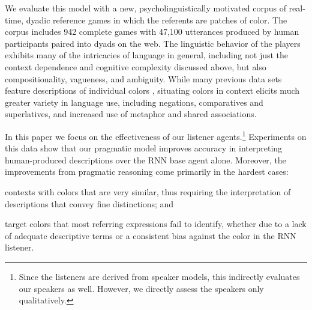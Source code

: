 \documentclass[11pt,letterpaper]{article}
\newcommand{\term}{\textit}
\renewcommand{\|}{\mid}
\begin{document}

We evaluate this model with a new, psycholinguistically motivated corpus of real-time, dyadic reference games in which
the referents are patches of color. 
The corpus includes 942 complete games with 47,100 utterances produced by
human participants paired into dyads on the web. The linguistic
behavior of the players exhibits many of the intricacies of language
in general, including not just the context dependence and cognitive
complexity discussed above, but also compositionality, vagueness, and
ambiguity. While many previous data sets feature descriptions of
individual colors \cite{Cook2005,Munroe2010,Kawakami2016}, situating
colors in context elicits much greater variety in language use,
including negations, comparatives and superlatives, and increased use
of metaphor and shared associations.

In this paper we focus on the effectiveness of
our listener agents.\footnote{Since the listeners are derived from
speaker models, this indirectly evaluates our speakers as well.
However, we directly assess the speakers only qualitatively.}
Experiments on this data show that our pragmatic model improves accuracy
in interpreting human-produced descriptions over the RNN base agent
alone. Moreover, the improvements from pragmatic reasoning come primarily
in the hardest cases:
%
\begin{enumerate*}[label=(\arabic*)]
\item contexts with colors that are very similar, thus requiring
  the interpretation of descriptions that convey fine distinctions;
  and
\item target colors that most referring expressions fail to identify,
  whether due to a lack of adequate descriptive terms or a consistent
  bias against the color in the RNN listener.
\end{enumerate*}
\end{document}
